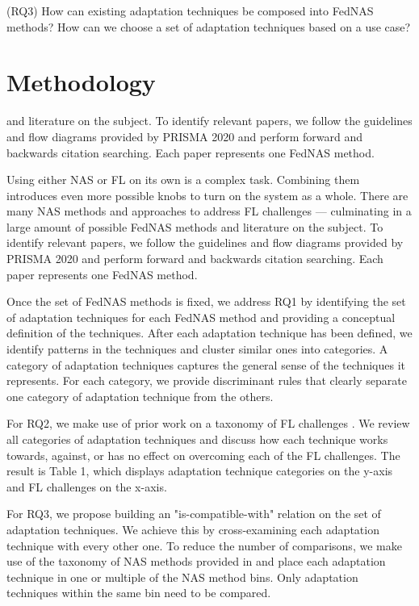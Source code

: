 \vspace{1em}
(RQ3) How can existing adaptation techniques be composed into FedNAS methods? How can we choose a set of adaptation techniques based on a use case?
\vspace{1em}

\section{Methodology}
and literature on the subject. To identify relevant papers, we follow the guidelines and flow diagrams provided by PRISMA 2020 \cite{prisma_2020} and perform forward and backwards citation searching. Each paper represents one FedNAS method.


Using either NAS or FL on its own is a complex task. Combining them introduces even more possible knobs to turn on the system as a whole. There are many NAS methods and approaches to address FL challenges — culminating in a large amount of possible FedNAS methods and literature on the subject. To identify relevant papers, we follow the guidelines and flow diagrams provided by PRISMA 2020 \cite{prisma_2020} and perform forward and backwards citation searching. Each paper represents one FedNAS method.

Once the set of FedNAS methods is fixed, we address RQ1 by identifying the set of adaptation techniques for each FedNAS method and providing a conceptual definition of the techniques. After each adaptation technique has been defined, we identify patterns in the techniques and cluster similar ones into categories. A category of adaptation techniques captures the general sense of the techniques it represents. For each category, we provide discriminant rules that clearly separate one category of adaptation technique from the others.

For RQ2, we make use of prior work on a taxonomy of FL challenges \cite{fl_taxonomy_2024}. We review all categories of adaptation techniques and discuss how each technique works towards, against, or has no effect on overcoming each of the FL challenges. The result is Table 1, which displays adaptation technique categories on the y-axis and FL challenges on the x-axis.

For RQ3, we propose building an "is-compatible-with" relation on the set of adaptation techniques. We achieve this by cross-examining each adaptation technique with every other one. To reduce the number of comparisons, we make use of the taxonomy of NAS methods provided in \cite{nas_1000_papers_2023} and place each adaptation technique in one or multiple of the NAS method bins. Only adaptation techniques within the same bin need to be compared.

